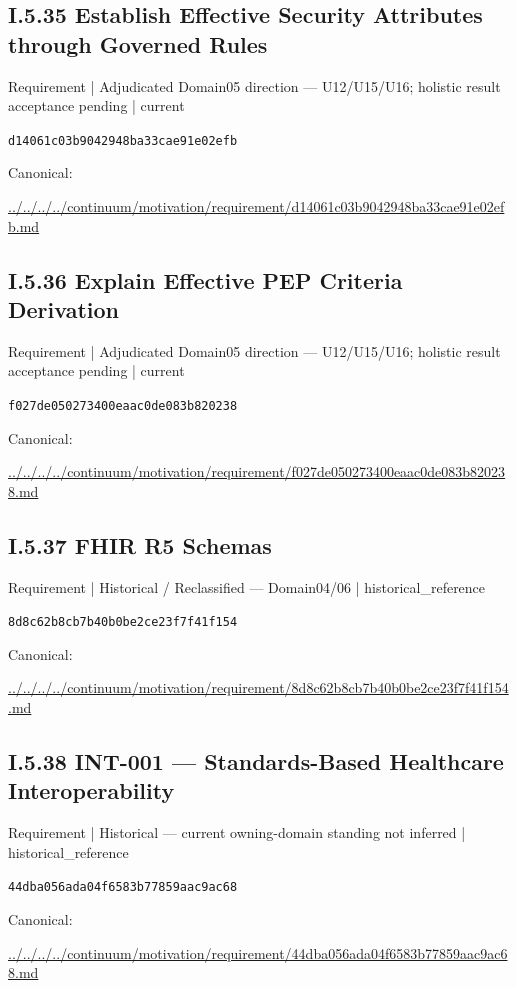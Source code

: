 \documentclass[10pt,a4paper]{article}
\begin{document}
\subsection*{I.5.35 Establish Effective Security Attributes through Governed Rules}
{\small Requirement | Adjudicated Domain05 direction — U12/U15/U16; holistic result acceptance pending | current}\par
\texttt{d14061c03b9042948ba33cae91e02efb}\par
Canonical: \par
{\footnotesize\url{../../../../continuum/motivation/requirement/d14061c03b9042948ba33cae91e02efb.md}}\par
\subsection*{I.5.36 Explain Effective PEP Criteria Derivation}
{\small Requirement | Adjudicated Domain05 direction — U12/U15/U16; holistic result acceptance pending | current}\par
\texttt{f027de050273400eaac0de083b820238}\par
Canonical: \par
{\footnotesize\url{../../../../continuum/motivation/requirement/f027de050273400eaac0de083b820238.md}}\par
\subsection*{I.5.37 FHIR R5 Schemas}
{\small Requirement | Historical / Reclassified — Domain04/06 | historical\_reference}\par
\texttt{8d8c62b8cb7b40b0be2ce23f7f41f154}\par
Canonical: \par
{\footnotesize\url{../../../../continuum/motivation/requirement/8d8c62b8cb7b40b0be2ce23f7f41f154.md}}\par
\subsection*{I.5.38 INT-001 — Standards-Based Healthcare Interoperability}
{\small Requirement | Historical — current owning-domain standing not inferred | historical\_reference}\par
\texttt{44dba056ada04f6583b77859aac9ac68}\par
Canonical: \par
{\footnotesize\url{../../../../continuum/motivation/requirement/44dba056ada04f6583b77859aac9ac68.md}}\par
\end{document}
